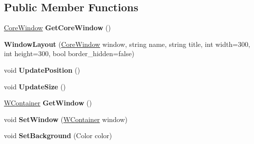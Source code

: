 \subsection*{Public Member Functions}
\begin{DoxyCompactItemize}
\item 
\mbox{\label{class_space_v_i_l_1_1_window_layout_af6094d36d89d5f4a50281cc3e5bd934d}} 
\mbox{\hyperlink{class_space_v_i_l_1_1_core_window}{Core\+Window}} {\bfseries Get\+Core\+Window} ()
\item 
\mbox{\label{class_space_v_i_l_1_1_window_layout_aaeffcab6b43619e1899f6310cc838010}} 
{\bfseries Window\+Layout} (\mbox{\hyperlink{class_space_v_i_l_1_1_core_window}{Core\+Window}} window, string name, string title, int width=300, int height=300, bool border\+\_\+hidden=false)
\item 
\mbox{\label{class_space_v_i_l_1_1_window_layout_a637fc8c9d1b5a3af28eaf7422cafcd6e}} 
void {\bfseries Update\+Position} ()
\item 
\mbox{\label{class_space_v_i_l_1_1_window_layout_af13e1e0544bcaefaaeaa123fd9dc0b52}} 
void {\bfseries Update\+Size} ()
\item 
\mbox{\label{class_space_v_i_l_1_1_window_layout_a39c5056a441bf4c532753a3cec4ad082}} 
\mbox{\hyperlink{class_space_v_i_l_1_1_w_container}{W\+Container}} {\bfseries Get\+Window} ()
\item 
\mbox{\label{class_space_v_i_l_1_1_window_layout_afcbdf9b8a212d3eeddfd3243e3d4b3a8}} 
void {\bfseries Set\+Window} (\mbox{\hyperlink{class_space_v_i_l_1_1_w_container}{W\+Container}} window)
\item 
\mbox{\label{class_space_v_i_l_1_1_window_layout_a6bc39ce349b7a492b57b785647c9b6d7}} 
void {\bfseries Set\+Background} (Color color)
\item 
\mbox{\label{class_space_v_i_l_1_1_window_layout_a14ad68ce6ef1034e7e1844c2daaf0afa}} 

\end{DoxyCompactItemize}
